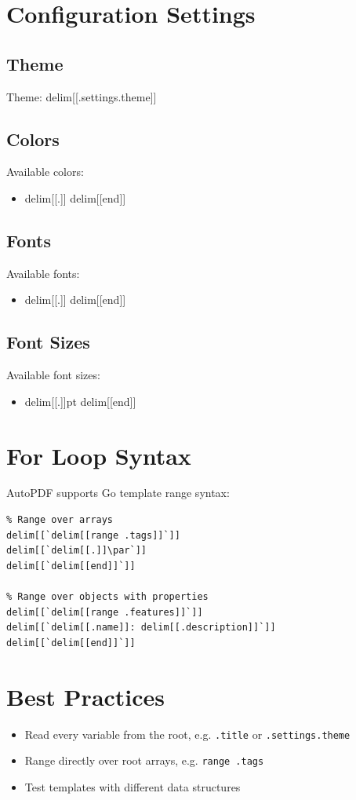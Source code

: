 \documentclass{article}
\begin{document}
\section{Configuration Settings}
\subsection{Theme}
Theme: delim[[.settings.theme]]

\subsection{Colors}
Available colors:
\begin{itemize}
delim[[range .settings.colors]]
\item delim[[.]]
delim[[end]]
\end{itemize}

\subsection{Fonts}
Available fonts:
\begin{itemize}
delim[[range .settings.fonts]]
\item delim[[.]]
delim[[end]]
\end{itemize}

\subsection{Font Sizes}
Available font sizes:
\begin{itemize}
delim[[range .settings.sizes]]
\item delim[[.]]pt
delim[[end]]
\end{itemize}

\section{For Loop Syntax}
AutoPDF supports Go template range syntax:

\begin{verbatim}
% Range over arrays
delim[[`delim[[range .tags]]`]]
delim[[`delim[[.]]\par`]]
delim[[`delim[[end]]`]]

% Range over objects with properties
delim[[`delim[[range .features]]`]]
delim[[`delim[[.name]]: delim[[.description]]`]]
delim[[`delim[[end]]`]]
\end{verbatim}

\section{Best Practices}
\begin{itemize}
\item Read every variable from the root, e.g. \texttt{.title} or \texttt{.settings.theme}
\item Range directly over root arrays, e.g. \texttt{range .tags}
\item Test templates with different data structures
\end{itemize}
\end{document}
